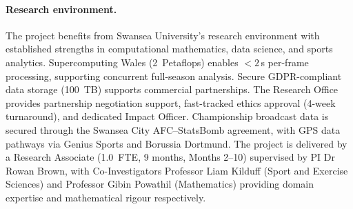 \paragraph{Research environment.}
The project benefits from Swansea University's research environment with established strengths in computational mathematics, data science, and sports analytics. Supercomputing Wales (2~Petaflops) enables ${<}2$\,s per-frame processing, supporting concurrent full-season analysis. Secure GDPR-compliant data storage (100~TB) supports commercial partnerships. The Research Office provides partnership negotiation support, fast-tracked ethics approval (4-week turnaround), and dedicated Impact Officer. Championship broadcast data is secured through the Swansea City AFC--StatsBomb agreement, with GPS data pathways via Genius Sports and Borussia Dortmund. The project is delivered by a Research Associate (1.0~FTE, 9 months, Months 2--10) supervised by PI Dr Rowan Brown, with Co-Investigators Professor Liam Kilduff (Sport and Exercise Sciences) and Professor Gibin Powathil (Mathematics) providing domain expertise and mathematical rigour respectively.
